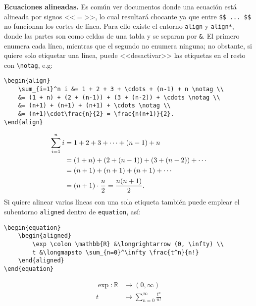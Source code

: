\documentclass[intro-breve-latex.tex]{subfiles}
\begin{document}
\textbf{Ecuaciones alineadas.}
Es común ver documentos donde una ecuación está alineada por signos <<$=$>>,
lo cual resultará chocante ya que entre \lstinline|$$ ... $$| no funcionan los cortes de línea. 
Para ello existe el entorno \texttt{align} y \texttt{align*}, donde las partes son como celdas de una tabla y se separan por \texttt{\&}.
El primero enumera cada línea, mientras que el segundo no enumera ninguna;
no obstante, si quiere solo etiquetar una línea, puede <<desactivar>> las etiquetas en el resto con \lstinline|\notag|, e.g:
\begin{lstlisting}[basicstyle=\footnotesize\ttfamily, tabsize=4]
\begin{align}
	\sum_{i=1}^n i &= 1 + 2 + 3 + \cdots + (n-1) + n \notag \\
	&= (1 + n) + (2 + (n-1)) + (3 + (n-2)) + \cdots \notag \\
	&= (n+1) + (n+1) + (n+1) + \cdots \notag \\
	&= (n+1)\cdot\frac{n}{2} = \frac{n(n+1)}{2}.
\end{align}
\end{lstlisting}
\begin{align}
	\sum_{i=1}^n i &= 1 + 2 + 3 + \cdots + (n-1) + n \notag \\
	&= (1 + n) + (2 + (n-1)) + (3 + (n-2)) + \cdots \notag \\
	&= (n+1) + (n+1) + (n+1) + \cdots \notag \\
	&= (n+1)\cdot\frac{n}{2} = \frac{n(n+1)}{2}.
\end{align}
Si quiere alinear varias líneas con una sola etiqueta también puede emplear el subentorno \texttt{aligned} dentro de
\texttt{equation}, así:
\begin{lstlisting}[basicstyle=\footnotesize\ttfamily, tabsize=4]
\begin{equation}
	\begin{aligned}
		\exp \colon \mathbb{R} &\longrightarrow (0, \infty) \\
		t &\longmapsto \sum_{n=0}^\infty \frac{t^n}{n!}
	\end{aligned}
\end{equation}
\end{lstlisting}
\begin{equation}
	\begin{aligned}
		\exp \colon \mathbb{R} &\longrightarrow (0, \infty) \\
		t &\longmapsto \sum_{n=0}^\infty \frac{t^n}{n!}
	\end{aligned}
\end{equation}
\end{document}
